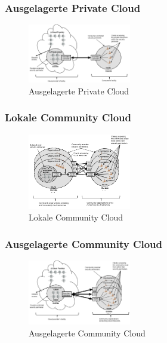 \subsubsection{Ausgelagerte Private Cloud}
\begin{figure}[H]
    \centering
	\includegraphics[width=0.4\textwidth]{Images/OutSourcedPrivateCloud}
	\caption{Ausgelagerte Private Cloud \cite{Badger}}
	\label{OutSourcedPrivateCloud}
\end{figure}


\subsubsection{Lokale Community Cloud}
\begin{figure}[H]
    \centering
	\includegraphics[width=0.4\textwidth]{Images/On-siteCommunityCloud}
	\caption{Lokale Community Cloud \cite{Badger}}
	\label{On-siteCommunityCloud}
\end{figure}



\subsubsection{Ausgelagerte Community Cloud}
\begin{figure}[H]
    \centering
	\includegraphics[width=0.4\textwidth]{Images/OutSourcedCommunityCloud}
	\caption{Ausgelagerte Community Cloud \cite{Badger}}
	\label{OutSourcedCommunityCloud}
\end{figure}


